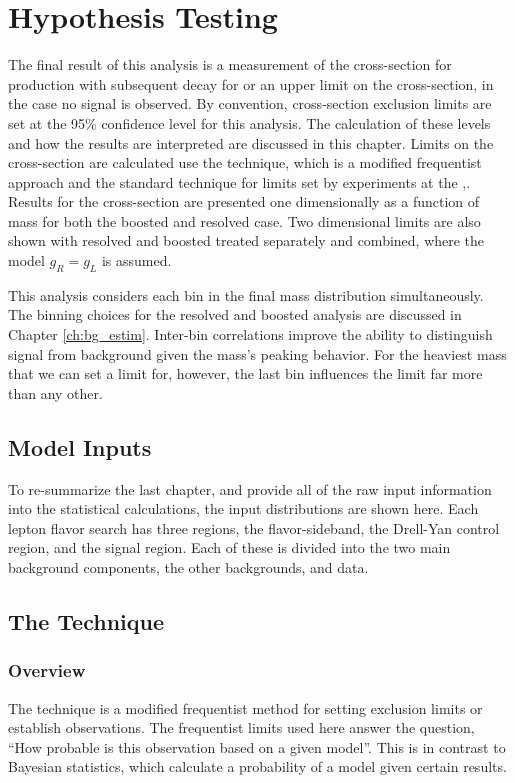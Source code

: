 \chapter{Hypothesis Testing}
The final result of this analysis is a measurement of the cross-section for \WR production with subsequent decay for \NR or an upper limit on the cross-section, in the case no signal is observed. By convention, cross-section exclusion limits are set at the 95\% confidence level for this analysis. The calculation of these levels and how the results are interpreted are discussed in this chapter. Limits on the cross-section are calculated use the \CLs technique, which is a modified frequentist approach and the standard technique for limits set by experiments at the \LHC \cite{CLS2002},\cite{smallStatCLs}. Results for the cross-section are presented one dimensionally as a function of \WR mass for both the boosted and resolved \NR case. Two dimensional limits are also shown with resolved and boosted treated separately and combined, where the model $g_{R}=g_{L}$ is assumed.

This analysis considers each bin in the final \WR mass distribution simultaneously. The binning choices for the resolved and boosted analysis are discussed in Chapter \ref{ch:bg_estim}. Inter-bin correlations improve the ability to distinguish signal from background given the \WR mass's peaking behavior. For the heaviest \WR mass that we can set a limit for, however, the last bin influences the limit far more than any other. 

\section{Model Inputs}
To re-summarize the last chapter, and provide all of the raw input information into the statistical calculations, the input distributions are shown here. Each lepton flavor search has three regions, the flavor-sideband, the Drell-Yan control region, and the signal region. Each of these is divided into the two main background components, the other backgrounds, and data.

\section{The \CLs Technique}

\subsection{Overview}
The \CLs technique is a modified frequentist method for setting exclusion limits or establish observations. The frequentist limits used here answer the question, ``How probable is this observation based on a given model''. This is in contrast to Bayesian statistics, which calculate a probability of a model given certain results.

